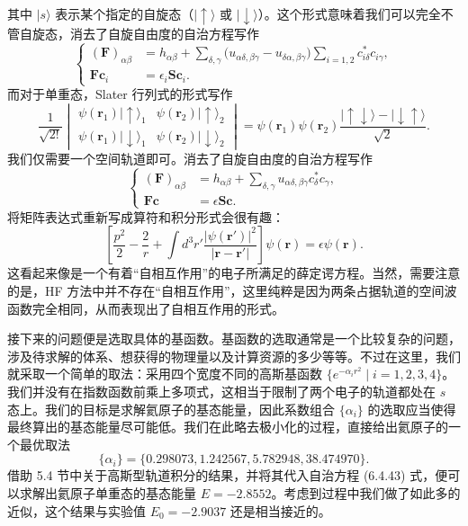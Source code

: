 其中 $|s\rangle$ 表示某个指定的自旋态（$|\uparrow\rangle$ 或 $|\downarrow\rangle$）。这个形式意味着我们可以完全不管自旋态，消去了自旋自由度的自治方程写作
\begin{equation}
 \left\{
 \begin{aligned}
 (\mathbf F)_{\alpha\beta}&=h_{\alpha\beta}+\sum_{\delta,\gamma}
 \bigl(u_{\alpha\delta,\beta\gamma}-u_{\delta\alpha,\beta\gamma}\bigr)
 \sum_{i=1,2}c_{i\delta}^*c_{i\gamma},\\
 \mathbf F\bm c_i&=\epsilon_i\mathbf S\bm c_i.
 \end{aligned}
 \right.
\tag{6.4.41}
\end{equation}
而对于单重态，Slater 行列式的形式写作
\begin{equation}
 \frac1{\sqrt{2!}}
 \begin{vmatrix}
 \psi(\bm r_1)|\uparrow\rangle_1&\psi(\bm r_2)|\uparrow\rangle_2\\
 \psi(\bm r_1)|\downarrow\rangle_1&\psi(\bm r_2)|\downarrow\rangle_2
 \end{vmatrix}
 =\psi(\bm r_1)\psi(\bm r_2)\frac{|\uparrow\downarrow\rangle-|\downarrow\uparrow\rangle}{\sqrt2}.
\tag{6.4.42}
\end{equation}
我们仅需要一个空间轨道即可。消去了自旋自由度的自治方程写作
\begin{equation}
 \left\{
 \begin{aligned}
 (\mathbf F)_{\alpha\beta}&=h_{\alpha\beta}+\sum_{\delta,\gamma}u_{\alpha\delta,\beta\gamma}c_\delta^*c_\gamma,\\
 \mathbf F\bm c&=\epsilon\mathbf S\bm c.
 \end{aligned}
 \right.
\tag{6.4.43}
\end{equation}
将矩阵表达式重新写成算符和积分形式会很有趣：
\begin{equation}
 \left[\frac{p^2}{2}-\frac2r+\int d^3r'\frac{|\psi(\bm r')|^2}{|\bm r-\bm r'|}\right]\psi(\bm r)=\epsilon\psi(\bm r).
\tag{6.4.44}
\end{equation}
这看起来像是一个有着“自相互作用”的电子所满足的薛定谔方程。当然，需要注意的是，HF 方法中并不存在“自相互作用”，这里纯粹是因为两条占据轨道的空间波函数完全相同，从而表现出了自相互作用的形式。

接下来的问题便是选取具体的基函数。基函数的选取通常是一个比较复杂的问题，涉及待求解的体系、想获得的物理量以及计算资源的多少等等。不过在这里，我们就采取一个简单的取法：采用四个宽度不同的高斯基函数 $\{e^{-\alpha_i r^2}\mid i=1,2,3,4\}$。我们并没有在指数函数前乘上多项式，这相当于限制了两个电子的轨道都处在 $s$ 态上。我们的目标是求解氦原子的基态能量，因此系数组合 $\{\alpha_i\}$ 的选取应当使得最终算出的基态能量尽可能低。我们在此略去极小化的过程，直接给出氦原子的一个最优取法
\begin{equation}
 \{\alpha_i\}=\{0.298073,1.242567,5.782948,38.474970\}.
\tag{6.4.45}
\end{equation}
借助 5.4 节中关于高斯型轨道积分的结果，并将其代入自治方程 (6.4.43) 式，便可以求解出氦原子单重态的基态能量 $E=-2.8552$。考虑到过程中我们做了如此多的近似，这个结果与实验值 $E_0=-2.9037$ 还是相当接近的。

